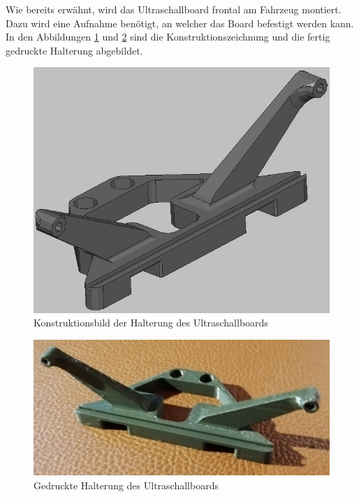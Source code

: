Wie bereits erwähnt, wird das Ultraschallboard frontal am Fahrzeug montiert. Dazu wird eine Aufnahme benötigt, an welcher das Board befestigt werden kann. In den Abbildungen \ref{fig:UltraschallHalterungKonstruktion} und \ref{fig:UltraschallHalterungDruck} sind die Konstruktionszeichnung und die fertig gedruckte Halterung abgebildet.

\begin{minipage}[b]{0.4\textwidth}
\centering
\begin{figure}[H] %
\includegraphics[width=.9\textwidth]{sec2/images/3DAnbaukomponenten/Konstruktionsbilder/UltraschallHalterungKonstruktion} 
\centering
\captionsetup{width=.95\textwidth}
\caption[Konstruktionsbild der Halterung des Ultraschallboards]{Konstruktionsbild der Halterung des Ultraschallboards}\centering
\label{fig:UltraschallHalterungKonstruktion}
\end{figure}
\end{minipage}
\begin{minipage}[b]{0.54\textwidth}
\begin{figure}[H] %
\includegraphics[width=.9\textwidth]{sec2/images/3DAnbaukomponenten/Druckbilder/UltraschallHalterungDruck} 
\centering
\captionsetup{width=.95\textwidth}
\caption[Gedruckte Halterung des Ultraschallboards]{Gedruckte Halterung des Ultraschallboards}\centering
\label{fig:UltraschallHalterungDruck}
\end{figure}
\end{minipage}
\vspace{4mm}

